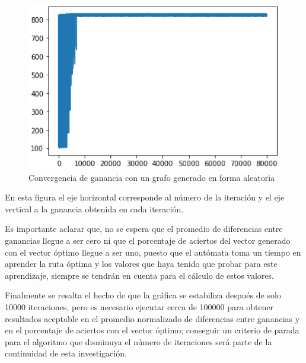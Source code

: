 \begin{figure}[]
	\centering
	\includegraphics[scale=0.8]{GanGrafoRandom.png}
	\caption{Convergencia de ganancia con un grafo generado en forma aleatoria}
	\label{Gangraforandom}
\end{figure}

En esta figura el eje horizontal corresponde al número de la iteración y el eje vertical a la ganancia obtenida en cada iteración. 

Es importante aclarar que, no se espera que el promedio de diferencias entre ganancias llegue a ser cero ni que el porcentaje de aciertos del vector generado con el vector óptimo llegue a ser uno, puesto que el autómata toma un tiempo en aprender la ruta óptima y los valores que haya tenido que probar para este aprendizaje, siempre se tendrán en cuenta para el cálculo de estos valores. 

Finalmente se resalta el hecho de que la gráfica se estabiliza después de solo 10000 iteraciones, pero es necesario ejecutar cerca de 100000 para obtener resultados aceptable en el promedio normalizado de diferencias entre ganancias y en el porcentaje de aciertos con el vector óptimo; conseguir un criterio de parada para el algoritmo que disminuya el número de iteraciones será parte de la continuidad de esta investigación.